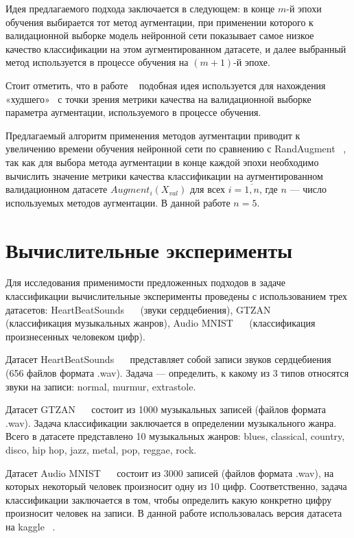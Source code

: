 \documentclass[12pt, fleqn]{article}
\begin{document}
Идея предлагаемого подхода заключается в следующем: в конце $m$-й эпохи обучения выбирается тот метод аугментации, при применении которого к валидационной выборке модель нейронной сети показывает самое низкое качество классификации на этом аугментированном датасете, и далее выбранный метод используется в процессе обучения на $(m + 1)$-й эпохе.

Стоит отметить, что в работе ~\cite{NearestAlgorithm} подобная идея используется для нахождения «худшего» \ с точки зрения метрики качества на валидационной выборке параметра аугментации, используемого в процессе обучения. 

Предлагаемый алгоритм применения методов аугментации приводит к увеличению времени обучения нейронной сети по сравнению с RandAugment ~\cite{RandAugment}, так как для выбора метода аугментации в конце каждой эпохи необходимо вычислить значение метрики качества классификации на аугментированном валидационном датасете $Augment_i(X_{val})$ для всех $i = \overline{1,n}$, где $n$ --- число используемых методов аугментации. В данной работе $n = 5$.

\section{Вычислительные эксперименты}
	
Для исследования применимости предложенных подходов в задаче классификации вычислительные эксперименты проведены с использованием трех датасетов: HeartBeatSounds ~\cite{HeartbeatSoundsArticle}~\cite{HeartbeatSoundsKaggle} (звуки сердцебиения), GTZAN ~\cite{GTZAN_Article}~\cite{GTZAN_kaggle} (классификация музыкальных жанров), Audio MNIST ~\cite{AudioMnistArticle}~\cite{AudioMnistKaggle} (классификация произнесенных человеком цифр).
	
Датасет HeartBeatSounds ~\cite{HeartbeatSoundsArticle}~\cite{HeartbeatSoundsKaggle} представляет собой записи звуков сердцебиения (656 файлов формата .wav). Задача --- определить, к какому из 3 типов относятся звуки на записи: normal, murmur, extrastole.  
	
Датасет GTZAN ~\cite{GTZAN_Article}~\cite{GTZAN_kaggle} состоит из 1000 музыкальных записей (файлов формата .wav). Задача классификации заключается в определении музыкального жанра. Всего в датасете представлено 10 музыкальных жанров: blues, classical, country, disco, hip hop, jazz, metal, pop, reggae, rock.

Датасет Audio MNIST ~\cite{AudioMnistArticle}~\cite{AudioMnistKaggle} состоит из 3000 записей (файлов формата .wav), на которых некоторый человек произносит одну из 10 цифр. Соответственно, задача классификации заключается в том, чтобы определить какую конкретно цифру произносит человек на записи. В данной работе использовалась версия датасета на kaggle ~\cite{AudioMnistKaggle}.
\end{document}
